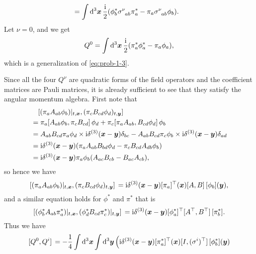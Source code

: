 \documentclass[hyperref, a4paper]{article}
\newcommand*{\ii}{\mathrm{i}}
\begin{document}
\begin{itemize}
\begin{equation}
\begin{aligned}
            &= \int \dd[3]{\vb*{x}} \frac{\ii}{2} (\phi^*_b \sigma\indices{^\nu_{ab}} \pi^*_a - \pi_a \sigma\indices{^\nu_{ab}} \phi_b).
        \end{aligned}
        \label{eq:generalized-charge}
    \end{equation}
    Let $\nu = 0$, and we get 
    \begin{equation}
        Q^0 = \int \dd[3]{\vb*{x}} \frac{\ii}{2} (\pi^*_a \phi^*_a - \pi_a \phi_a),
    \end{equation}
    which is a generalization of \eqref{eq:prob-1-3}.

    Since all the four $Q^\nu$ are quadratic forms of the field operators and the coefficient matrices are Pauli matrices, it is already sufficient to see that they satisfy the angular momentum algebra.
    First note that 
    \[
        \begin{aligned}
            &\quad \comm*{(\pi_a A_{ab} \phi_b)|_{t, \vb*{x}}}{(\pi_c B_{cd} \phi_d)_{t, \vb*{y}}} \\
            &= \pi_a \comm*{A_{ab} \phi_b}{\pi_c B_{cd}} \phi_d + \pi_c \comm*{\pi_a A_{ab}}{B_{cd} \phi_d} \phi_b \\
            &= A_{ab} B_{cd} \pi_a \phi_d \times \ii \delta^{(3)}(\vb*{x} - \vb*{y}) \delta_{bc} - A_{ab} B_{cd} \pi_c \phi_b \times \ii \delta^{(3)}(\vb*{x} - \vb*{y}) \delta_{ad} \\
            &= \ii \delta^{(3)}(\vb*{x} - \vb*{y}) (\pi_a A_{ab} B_{bd} \phi_d - \pi_c B_{cd} A_{db} \phi_b) \\
            &= \ii \delta^{(3)}(\vb*{x} - \vb*{y}) \pi_a \phi_b (A_{ac} B_{cb} - B_{ac} A_{cb}),
        \end{aligned}
    \]
    so hence we have 
    \begin{equation}
        \comm*{(\pi_a A_{ab} \phi_b)|_{t, \vb*{x}}}{(\pi_c B_{cd} \phi_d)_{t, \vb*{y}}} = \ii \delta^{(3)}(\vb*{x} - \vb*{y}) [\pi_a]^\top(\vb*{x}) \comm*{A}{B} [\phi_b](\vb*{y}),
    \end{equation}
    and a similar equation holds for $\phi^*$ and $\pi^*$ that is 
    \begin{equation}
        \comm*{(\phi^*_b A_{ab} \pi^*_a)|_{t,\vb*{x}}}{(\phi^*_d B_{cd} \pi^*_c)|_{t, \vb*{y}}} = \ii \delta^{(3)}(\vb*{x} - \vb*{y}) [\phi^*_a]^\top \comm*{A^\top}{B^\top} [\pi^*_b].
    \end{equation}
    Thus we have 
    \[
        \begin{aligned}
            \comm*{Q^0}{Q^i} &= - \frac{1}{4} \int \dd[3]{\vb*{x}} \int \dd[3]{\vb*{y}} \Big( \ii \delta^{(3)}(\vb*{x} - \vb*{y}) [\pi^*_a]^\top(\vb*{x}) \comm*{I}{(\sigma^i)^\top} [\phi^*_b](\vb*{y}) \\

\end{aligned}\]
\end{itemize}
\end{document}
